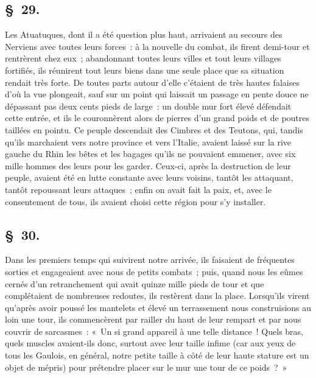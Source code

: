 \documentclass[french,twoside]{book} %
\begin{document}
\subsection[{§ 29.}]{ \textsc{§ 29.} }
\noindent Les Atuatuques, dont il a été question plus haut, arrivaient au secours des Nerviens avec toutes leurs forces : à la nouvelle du combat, ils firent demi-tour et rentrèrent chez eux ; abandonnant toutes leurs villes et tout leurs villages fortifiés, ils réunirent tout leurs biens dans une seule place que sa situation rendait très forte. De toutes parts autour d’elle c’étaient de très hautes falaises d’où la vue plongeait, sauf sur un point qui laissait un passage en pente douce ne dépassant pas deux cents pieds de large : un double mur fort élevé défendait cette entrée, et ils le couronnèrent alors de pierres d’un grand poids et de poutres taillées en pointu. Ce peuple descendait des Cimbres et des Teutons, qui, tandis qu’ils marchaient vers notre province et vers l’Italie, avaient laissé sur la rive gauche du Rhin les bêtes et les bagages qu’ils ne pouvaient emmener, avec six mille hommes des leurs pour les garder. Ceux-ci, après la destruction de leur peuple, avaient été en lutte constante avec leurs voisins, tantôt les attaquant, tantôt repoussant leurs attaques ; enfin on avait fait la paix, et, avec le consentement de tous, ils avaient choisi cette région pour s’y installer.
\subsection[{§ 30.}]{ \textsc{§ 30.} }
\noindent Dans les premiers temps qui suivirent notre arrivée, ils faisaient de fréquentes sorties et engageaient avec nous de petits combats ; puis, quand nous les eûmes cernés d’un retranchement qui avait quinze mille pieds de tour et que complétaient de nombreuses redoutes, ils restèrent dans la place. Lorsqu’ils virent qu’après avoir poussé les mantelets et élevé un terrassement nous construisions au loin une tour, ils commencèrent par railler du haut de leur rempart et par nous couvrir de sarcasmes : « Un si grand appareil à une telle distance ! Quels bras, quels muscles avaient-ils donc, surtout avec leur taille infime (car aux yeux de tous les Gaulois, en général, notre petite taille à côté de leur haute stature est un objet de mépris) pour prétendre placer sur le mur une tour de ce poids ? »
\end{document}
